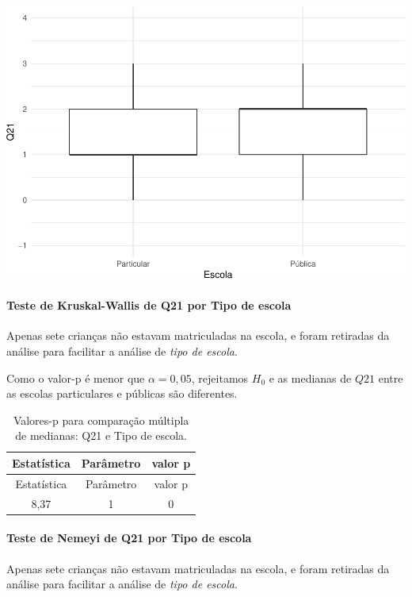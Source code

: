 \documentclass[]{article}
\let\oldparagraph\paragraph
\renewcommand{\paragraph}[1]{\oldparagraph{#1}\mbox{}}
\begin{document}
\begin{center}\includegraphics[width=0.75\linewidth]{relatorio_files/figure-latex/unnamed-chunk-358-1} \end{center}

\hypertarget{teste-de-kruskal-wallis-de-q21-por-tipo-de-escola}{%
\paragraph{Teste de Kruskal-Wallis de Q21 por Tipo de escola}\label{teste-de-kruskal-wallis-de-q21-por-tipo-de-escola}}

Apenas sete crianças não estavam matriculadas na escola, e foram retiradas da análise para facilitar a análise de \emph{tipo de escola}.

Como o valor-p é menor que \(\alpha=0,05\), rejeitamos \(H_0\) e as medianas de \(Q21\) entre as escolas particulares e públicas são diferentes.

\begin{longtable}[]{@{}ccc@{}}
\caption{\label{tab:unnamed-chunk-359}Valores-p para comparação múltipla de medianas: Q21 e Tipo de escola.}\tabularnewline
\toprule
Estatística & Parâmetro & valor p\tabularnewline
\midrule
\endfirsthead
\toprule
Estatística & Parâmetro & valor p\tabularnewline
\midrule
\endhead
8,37 & 1 & 0\tabularnewline
\bottomrule
\end{longtable}

\hypertarget{teste-de-nemeyi-de-q21-por-tipo-de-escola}{%
\paragraph{Teste de Nemeyi de Q21 por Tipo de escola}\label{teste-de-nemeyi-de-q21-por-tipo-de-escola}}

Apenas sete crianças não estavam matriculadas na escola, e foram retiradas da análise para facilitar a análise de \emph{tipo de escola}.
\end{document}
